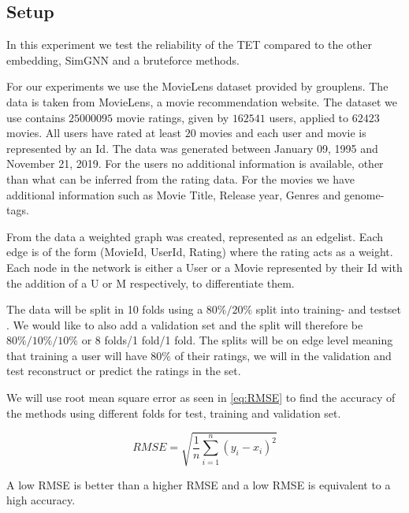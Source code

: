 \subsection{Setup}
In this experiment we test the reliability of the TET compared to the other embedding, SimGNN and a bruteforce methods. 

For our experiments we use the MovieLens dataset provided by grouplens\cite{Grouplensdata}. The data is taken from MovieLens, a movie recommendation website. The dataset we use contains $25000095$ movie ratings, given by $162541$ users, applied to $62423$ movies. All users have rated at least $20$ movies and each user and movie is represented by an Id. The data was generated between January 09, 1995 and November 21, 2019. For the users no additional information is available, other than what can be inferred from the rating data. For the movies we have additional information such as Movie Title, Release year, Genres and genome-tags.

From the data a weighted graph was created, represented as an edgelist. Each edge is of the form (MovieId, UserId, Rating) where the rating acts as a weight. Each node in the network is either a User or a Movie represented by their Id with the addition of a U or M respectively, to differentiate them.

The data will be split in 10 folds using a $80\%/20\%$ split into training- and testset \cite{Ricci2015}. We would like to also add a validation set and the split will therefore be $80\%/10\%/10\%$ or 8 folds/1 fold/1 fold. The splits will be on edge level meaning that training a user will have $80\%$ of their ratings, we will in the validation and test reconstruct or predict the ratings in the set.

We will use root mean square error as seen in \autoref{eq:RMSE}\cite{chai2014root} to find the accuracy of the methods using different folds for test, training  and validation set.

\begin{equation}\label{eq:RMSE}
RMSE = \sqrt{\frac{1}{n}\sum^n_{i=1}(y_i - x_i)^2}
\end{equation}

A low RMSE is better than a higher RMSE and a low RMSE is equivalent to a high accuracy.

